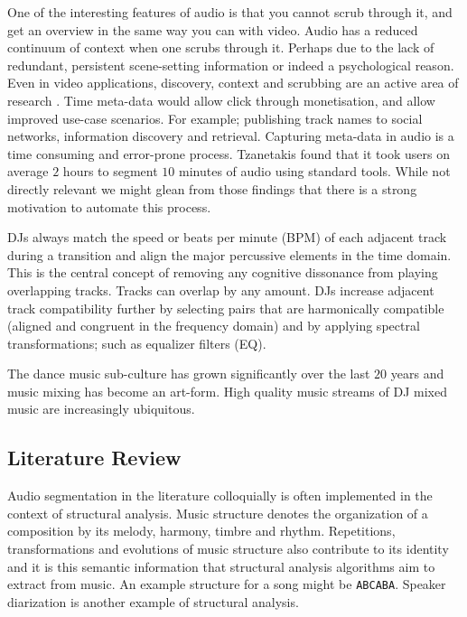 \documentclass[twocolumn]{article}
\begin{document}
	One of the interesting features of audio is that you cannot scrub through it, and get an overview in the same way you can with video. Audio has a reduced continuum of context when one scrubs through it. Perhaps due to the lack of redundant, persistent scene-setting information or indeed a psychological reason. Even in video applications, discovery, context and scrubbing are an active area of research \cite{Matejka:2013:SIO:2470654.2466149}. Time meta-data would allow click through monetisation, and allow improved use-case scenarios. For example; publishing track names to social networks, information discovery and retrieval. Capturing meta-data in audio is a time consuming and error-prone process. Tzanetakis \cite{tzanetakis1999framework} found that it took users on average $2$ hours to segment $10$ minutes of audio using standard tools. While not directly relevant we might glean from those findings that there is a strong motivation to automate this process.
	
	DJs always match the speed or beats per minute (BPM) of each adjacent track during a transition and align the major percussive elements in the time domain. This is the central concept of removing any cognitive dissonance from playing overlapping tracks. Tracks can overlap by any amount. DJs increase adjacent track compatibility further by selecting pairs that are harmonically compatible (aligned and congruent in the frequency domain) and by applying spectral transformations; such as equalizer filters (EQ).
	
	The dance music sub-culture has grown significantly over the last $20$ years and music mixing has become an art-form. High quality music streams of DJ mixed music are increasingly ubiquitous. 
	
	\subsection{Literature Review}
	
	Audio segmentation in the literature colloquially is often implemented in the context of structural analysis. Music structure denotes the organization of a composition by its melody, harmony, timbre and rhythm. Repetitions, transformations and evolutions of music structure also contribute to its identity and it is this semantic information that structural analysis algorithms aim to extract from music. An example structure for a song might be \texttt{ABCABA}. Speaker diarization is another example of structural analysis.
	
\end{document}

